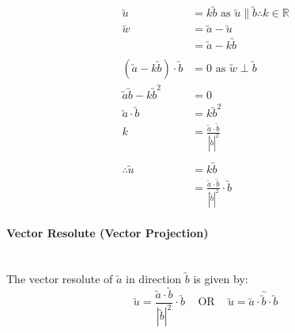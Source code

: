 \documentclass[a4paper]{article}
\begin{document}
				\begin{align*}
					\utilde{u}&=k\utilde{b}\text{ as }\utilde{u}\parallel\utilde{b}\therefore k\in\mathbb{R} \\
					\utilde{w}&=\utilde{a}-\utilde{u} \\
					&=\utilde{a}-k\utilde{b} \\\\
					(\utilde{a}-k\utilde{b})\cdot\utilde{b}&=0\text{ as }\utilde{w}\perp\utilde{b} \\
					\utilde{a}\utilde{b}-k\utilde{b}^2&=0 \\
					\utilde{a}\cdot\utilde{b}&=k\utilde{b}^2 \\
					k&=\frac{\utilde{a}\cdot\utilde{b}}{|\utilde{b}|^2} \\\\
					\therefore\utilde{u}&=k\utilde{b} \\
					&=\frac{\utilde{a}\cdot\utilde{b}}{|\utilde{b}|^2}\cdot\utilde{b}
				\end{align*}
				\paragraph{Vector Resolute (Vector Projection)}\mbox{}\\
				The vector resolute of $\utilde{a}$ in direction $\utilde{b}$ is given by:
				\[
					\utilde{u}=\frac{\utilde{a}\cdot\utilde{b}}{|\utilde{b}|^2}\cdot\utilde{b}\;\;\;\text{ OR }\;\;\;\utilde{u}=\utilde{a}\cdot\hat{\utilde{b}}\cdot\utilde{b}
				\]
\end{document}
